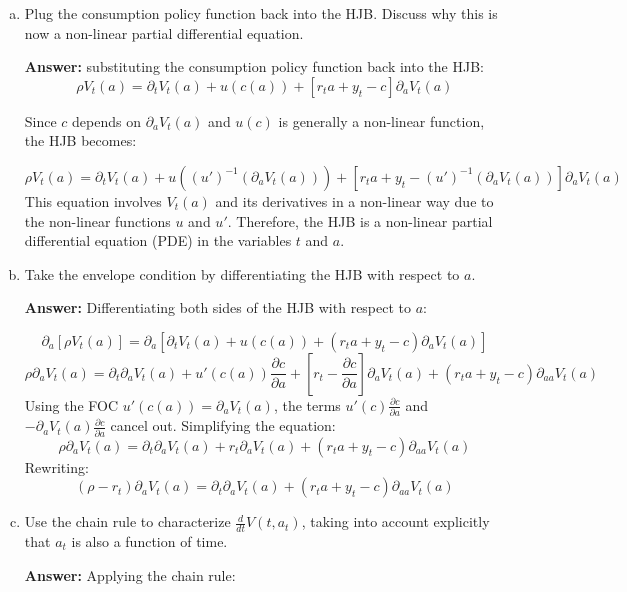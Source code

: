 \documentclass[11pt]{extarticle}
\theoremstyle{plain}
\theoremstyle{definition}
\begin{document}
\begin{enumerate}[(a)]
\item Plug the consumption policy function back into the HJB. Discuss why this is now a non-linear partial differential equation. 

\textbf{Answer:} substituting the consumption policy function back into the HJB:
    \[
    \rho V_t(a) = \partial_t V_t(a) + u(c(a)) + \left[ r_t a + y_t - c \right] \partial_a V_t(a)
    \]
    
    Since \(c\) depends on \(\partial_a V_t(a)\) and \(u(c)\) is generally a non-linear function, the HJB becomes:
    
    \[
    \rho V_t(a) = \partial_t V_t(a) + u\left( (u')^{-1} \left( \partial_a V_t(a) \right) \right) + \left[ r_t a + y_t - (u')^{-1} \left( \partial_a V_t(a) \right) \right] \partial_a V_t(a)
    \]
    This equation involves \(V_t(a)\) and its derivatives in a non-linear way due to the non-linear functions \(u\) and \(u'\). Therefore, the HJB is a non-linear partial differential equation (PDE) in the variables \(t\) and \(a\).
	
\item Take the envelope condition by differentiating the HJB with respect to $a$. 

\textbf{Answer:}   
    Differentiating both sides of the HJB with respect to \(a\):

    \[
    \partial_a \left[ \rho V_t(a) \right] = \partial_a \left[ \partial_t V_t(a) + u(c(a)) + \left( r_t a + y_t - c \right) \partial_a V_t(a) \right]
    \]
    \[
    \rho \partial_a V_t(a) = \partial_t \partial_a V_t(a) + u'(c(a)) \frac{\partial c}{\partial a} + \left[ r_t - \frac{\partial c}{\partial a} \right] \partial_a V_t(a) + \left( r_t a + y_t - c \right) \partial_{aa} V_t(a)
    \]    
    Using the FOC \(u'(c(a)) = \partial_a V_t(a)\), the terms \(u'(c) \frac{\partial c}{\partial a}\) and \(-\partial_a V_t(a) \frac{\partial c}{\partial a}\) cancel out. Simplifying the equation:
    \[
    \rho \partial_a V_t(a) = \partial_t \partial_a V_t(a) + r_t \partial_a V_t(a) + \left( r_t a + y_t - c \right) \partial_{aa} V_t(a)
    \]
    Rewriting:
    \[
    (\rho - r_t) \partial_a V_t(a) = \partial_t \partial_a V_t(a) + \left( r_t a + y_t - c \right) \partial_{aa} V_t(a)
    \]
    
\item Use the chain rule to characterize $\frac{d}{dt} V(t, a_t)$, taking into account explicitly that $a_t$ is also a function of time. 

\textbf{Answer:}  Applying the chain rule:
    

\end{enumerate}
\end{document}
